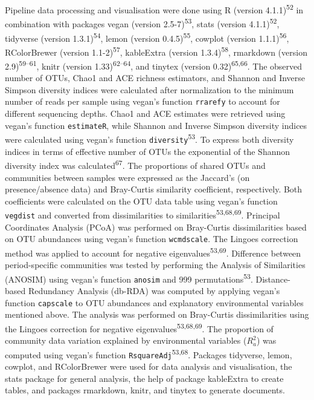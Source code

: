 \documentclass[
  12pt,
]{article}
\begin{document}
Pipeline data processing and visualisation were done using R (version
4.1.1)\textsuperscript{52} in combination with packages vegan (version
2.5-7)\textsuperscript{53}, stats (version 4.1.1)\textsuperscript{52},
tidyverse (version 1.3.1)\textsuperscript{54}, lemon (version
0.4.5)\textsuperscript{55}, cowplot (version 1.1.1)\textsuperscript{56},
RColorBrewer (version 1.1-2)\textsuperscript{57}, kableExtra (version
1.3.4)\textsuperscript{58}, rmarkdown (version
2.9)\textsuperscript{59--61}, knitr (version
1.33)\textsuperscript{62--64}, and tinytex (version
0.32)\textsuperscript{65,66}. The observed number of OTUs, Chao1 and ACE
richness estimators, and Shannon and Inverse Simpson diversity indices
were calculated after normalization to the minimum number of reads per
sample using vegan's function \texttt{rrarefy} to account for different
sequencing depths. Chao1 and ACE estimates were retrieved using vegan's
function \texttt{estimateR}, while Shannon and Inverse Simpson diversity
indices were calculated using vegan's function
\texttt{diversity}\textsuperscript{53}. To express both diversity
indices in terms of effective number of OTUs the exponential of the
Shannon diversity index was calculated\textsuperscript{67}. The
proportions of shared OTUs and communities between samples were
expressed as the Jaccard's (on presence/absence data) and Bray-Curtis
similarity coefficient, respectively. Both coefficients were calculated
on the OTU data table using vegan's function \texttt{vegdist} and
converted from dissimilarities to
similarities\textsuperscript{53,68,69}. Principal Coordinates Analysis
(PCoA) was performed on Bray-Curtis dissimilarities based on OTU
abundances using vegan's function \texttt{wcmdscale}. The Lingoes
correction method was applied to account for negative
eigenvalues\textsuperscript{53,69}. Difference between period-specific
communities was tested by performing the Analysis of Similarities
(ANOSIM) using vegan's function \texttt{anosim} and 999
permutations\textsuperscript{53}. Distance-based Redundancy Analysis
(db-RDA) was computed by applying vegan's function \texttt{capscale} to
OTU abundances and explanatory environmental variables mentioned above.
The analysis was performed on Bray-Curtis dissimilarities using the
Lingoes correction for negative eigenvalues\textsuperscript{53,68,69}.
The proportion of community data variation explained by environmental
variables (\(R^2_a\)) was computed using vegan's function
\texttt{RsquareAdj}\textsuperscript{53,68}. Packages tidyverse, lemon,
cowplot, and RColorBrewer were used for data analysis and visualisation,
the stats package for general analysis, the help of package kableExtra
to create tables, and packages rmarkdown, knitr, and tinytex to generate
documents.
\end{document}
